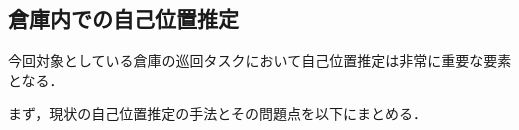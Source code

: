 \subsection{倉庫内での自己位置推定}
\label{map_problem}
今回対象としている倉庫の巡回タスクにおいて自己位置推定は非常に重要な要素となる．

まず，現状の自己位置推定の手法とその問題点を以下にまとめる．



